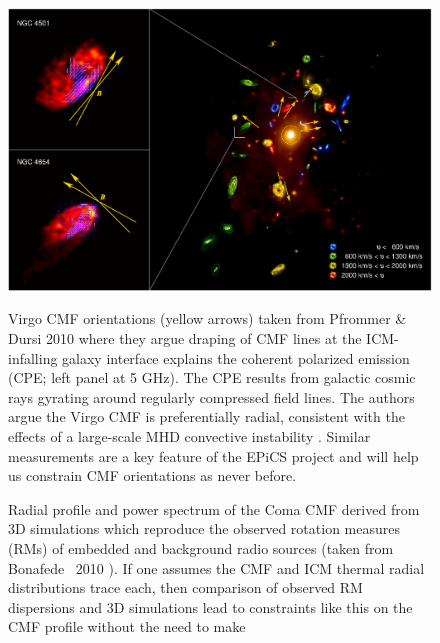 \begin{figure}
  \begin{center}
    \begin{minipage}{0.495\linewidth}
      \includegraphics*[width=\linewidth, trim=0mm 0mm 0mm 0mm, clip]{pfrommer.ps}
    \end{minipage}
    \begin{minipage}{0.495\linewidth}
      \caption{Virgo CMF orientations (yellow arrows) taken from
        Pfrommer \& Dursi 2010 \citep{2010NatPh...6..520P} where they
        argue draping of CMF lines at the ICM-infalling galaxy
        interface explains the coherent polarized emission (CPE; left
        panel at 5 GHz). The CPE results from galactic cosmic rays
        gyrating around regularly compressed field lines. The authors
        argue the Virgo CMF is preferentially radial, consistent with
        the effects of a large-scale MHD convective instability
        \citep[\ie\ the MTI;][]{2000ApJ...534..420B}. Similar
        measurements are a key feature of the EPiCS project and will
        help us constrain CMF orientations as never before.
        \label{fig:pfrommer}}
    \end{minipage}
    \begin{minipage}{0.495\linewidth}
      \caption{Radial profile and power spectrum of the Coma CMF
        derived from 3D simulations which reproduce the observed
        rotation measures (RMs) of embedded and background radio
        sources (taken from Bonafede \etal\ 2010
        \citep{2010A&A...513A..30B}). If one assumes the CMF and ICM
        thermal radial distributions trace each, then comparison of
        observed RM dispersions and 3D simulations lead to constraints
        like this on the CMF profile without the need to make
}
\end{minipage}
\end{center}
\end{figure}
